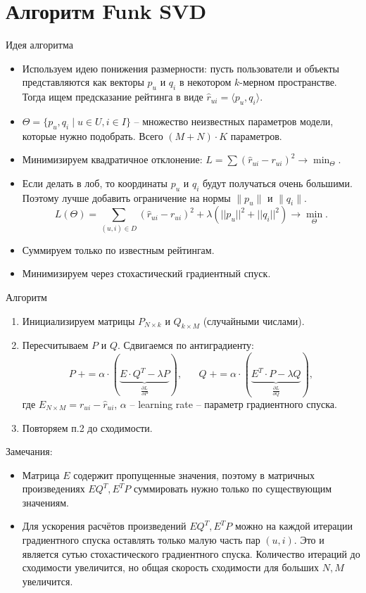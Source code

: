 \documentclass[9pt]{beamer}
\begin{document}
\section{Алгоритм Funk SVD}

\begin{frame}{Идея алгоритма}
\begin{itemize}
    \item Используем идею понижения размерности: пусть пользователи и объекты представляются как векторы $p_u$ и $q_i$ в некотором $k$-мерном пространстве. Тогда ищем предсказание рейтинга в виде $\hat r_{ui} = \langle p_u, q_i \rangle$.
    \item $\Theta = \{p_u, q_i\;|\; u\in U, i\in I\}$ – множество неизвестных параметров модели, которые нужно подобрать. Всего $(M+N)\cdot K$ параметров.
    \item Минимизируем квадратичное отклонение: $L = \sum(\hat r_{ui} - r_{ui})^2 \rightarrow \min_{\Theta}$.
    \item Если делать в лоб, то координаты $p_u$ и $q_i$ будут получаться очень большими. Поэтому лучше добавить ограничение на нормы $\|p_u\|$ и $\|q_i\|$. 
$$L(\Theta) = \sum_{(u, i)\in D}(\hat r_{ui} - r_{ui})^2  + \lambda \left(||p_u||^2 + ||q_i||^2\right) \rightarrow \min_{\Theta}.$$
    \item Суммируем только по известным рейтингам.
    \item Минимизируем через стохастический градиентный спуск.
\end{itemize}
\end{frame}

\begin{frame}{Алгоритм}
\begin{enumerate}
    \item Инициализируем матрицы $P_{N\times k}$ и $Q_{k\times M}$ (случайными числами).
    \item Пересчитываем $P$ и $Q$. Сдвигаемся по антиградиенту:
    $$P\;+= \alpha \cdot (\underbrace{E\cdot Q^T - \lambda P}_{\frac{\partial L}{\partial P}}), \;\;\;\;\;\; Q\;+= \alpha\cdot(\underbrace{E^T\cdot P - \lambda Q}_{\frac{\partial L}{\partial Q}}),$$
    где $E_{N\times M} = r_{ui} - \hat r_{ui}$, $\alpha$ -- learning rate -- параметр градиентного спуска.
    \item Повторяем п.2 до сходимости.
\end{enumerate}
Замечания:
\begin{itemize}
    \item Матрица $E$ содержит пропущенные значения, поэтому в матричных произведениях $EQ^T, E^TP$ суммировать нужно только по существующим значениям.
    \item Для ускорения расчётов произведений $EQ^T, E^TP$ можно на каждой итерации градиентного спуска оставлять только малую часть пар $(u, i)$. Это и является сутью стохастического градиентного спуска. Количество итераций до сходимости увеличится, но общая скорость сходимости для больших $N, M$ увеличится.
\end{itemize}
\end{frame}
\end{document}
